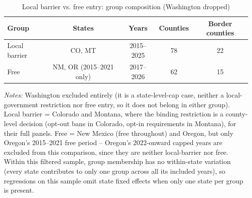\begin{table}[htbp]
\centering
\caption{Local barrier vs. free entry: group composition (Washington dropped)}
\label{tab:localbarrier_vs_free_summary}
\small
\begin{tabular}{lcccc}
\toprule
Group & States & Years & Counties & Border counties \\
\midrule
Local barrier & CO, MT & 2015--2025 & 78 & 22 \\
Free & NM, OR (2015--2021 only) & 2017--2026 & 62 & 15 \\
\bottomrule
\end{tabular}
\begin{minipage}{0.85\textwidth}
\vspace{0.3em}
\footnotesize
\textit{Notes:} Washington excluded entirely (it is a state-level-cap case, neither a local-government
restriction nor free entry, so it does not belong in either group). Local barrier = Colorado and Montana,
where the binding restriction is a county-level decision (opt-out bans in Colorado, opt-in requirements in
Montana), for their full panels. Free = New Mexico (free throughout) and Oregon, but only Oregon's 2015--2021
free period -- Oregon's 2022-onward capped years are excluded from this comparison, since they are neither
local-barrier nor free. Within this filtered sample, group membership has no within-state variation (every
state contributes to only one group across all its included years), so regressions on this sample omit state
fixed effects when only one state per group is present.
\end{minipage}
\end{table}
